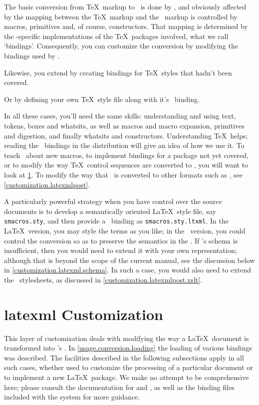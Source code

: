 \documentclass{book}
\begin{document}
The basic conversion from \TeX\ markup to \XML\ is done by
, and obviously affected by the mapping between the \TeX\ markup
and the \XML\ markup is controlled by macros, primitives and, of course,
constructors.  That mapping is determined by the \LaTeXML-specific implementations
of the \TeX\ packages involved, what we call `bindings'.
Consequently, you can customize the conversion by modifying the
bindings used by .

Likewise, you extend  by creating bindings for
\TeX\ styles that hadn't been covered.

Or by defining your own \TeX\ style file along with it's \LaTeXML\ binding.

In all these cases, you'll need the same skills: understanding and using
text, tokens, boxes and whatsits, as well as macros and macro expansion,
primitives and digestion, and finally whatsits and constructors.
Understanding \TeX\ helps; reading the \LaTeXML\ bindings in the distribution
will give an idea of how we use it.
To teach \LaTeXML\ about new macros, to implement bindings for a
package not yet covered, or to modify the way \TeX\ control sequences
are converted to \XML, you will want to look at \ref{customization.latexml}.
To modify the way that \XML\ is converted to other formats such as \HTML,
see \ref{customization.latexmlpost}.

A particularly powerful strategy when you have control over the
source documents is to develop a semantically oriented \LaTeX\ style file,
say \texttt{smacros.sty}, and then provide a \LaTeXML\ binding
as \texttt{smacros.sty.ltxml}. In the \LaTeX\ version, you may style
the terms as you like; in the \LaTeXML\ version, you could control
the conversion so as to preserve the semantics in the \XML.
If \LaTeXML's schema is insufficient, then you would need to extend it
with your own representation; although that is beyond the scope of
the current manual, see the discussion below in \ref{customization.latexml.schema}.
In such a case, you would also need to extend the \XSLT\ stylesheets,
as discussed in \ref{customization.latexmlpost.xslt}.

\section{latexml Customization}\label{customization.latexml}
This layer of customization deals with modifying the way a \LaTeX\ document
is transformed into \LaTeXML's \XML.
In \ref{usage.conversion.loading} the loading of various bindings was
described.  The facilities described in the following subsections
apply in all such cases, whether used to customize the processing
of a particular document or to implement a new \LaTeX\ package.
We make no attempt to be comprehensive here; please consult
the documentation for  and ,
as well as the binding files included with the system
for more guidance.
\end{document}
